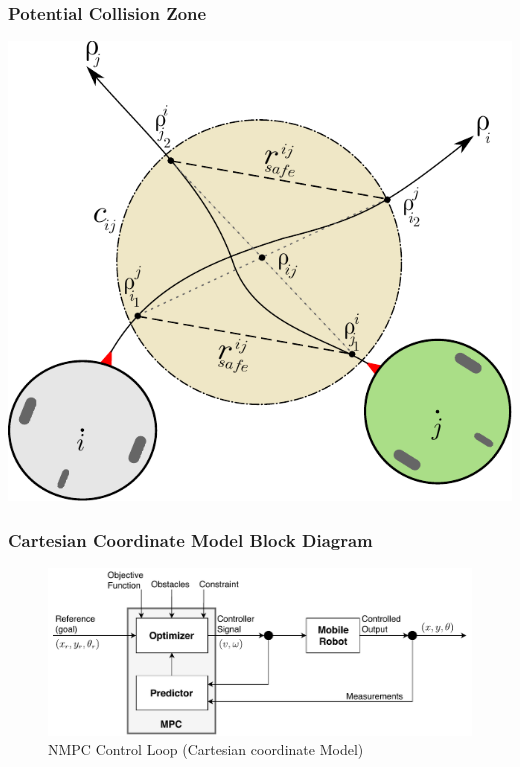 	\begin{frame}
		\frametitle{Potential Collision Zone}
		\centering
		\includegraphics[scale=0.6]{pictures/robots_pot_coll.pdf}
	\end{frame}
	
	\begin{frame}
		\frametitle{Cartesian Coordinate Model Block Diagram}
		\begin{figure}[hbtp]
			\centering
			\includegraphics[scale=0.7]{pictures/block_diagram_cart.pdf}
			\caption{NMPC Control Loop (Cartesian coordinate Model)}
		\end{figure}
	\end{frame}

